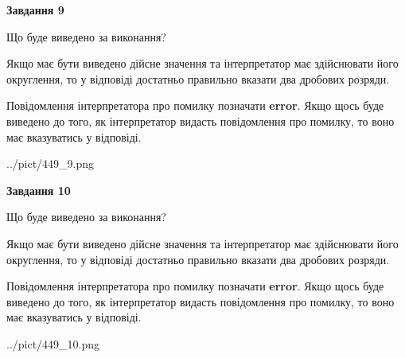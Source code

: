 \documentclass[12pt, ukrainian]{article}
\begin{document}
{\begin {Large}
{\begin {center}\textbf{Завдання 9}\end {center}}\par
Що буде виведено за виконання? \par

Якщо має бути виведено дійсне значення та інтерпретатор має здійснювати його округлення, 
то у відповіді достатньо правильно вказати два дробових розряди.

Повідомлення інтерпретатора про помилку позначати \textbf{error}.
Якщо щось буде виведено до того, як інтерпретатор видасть повідомлення про помилку, 
то воно має вказуватись у відповіді. \par

\begin{center}
	{../pict/449_9.png}
\end{center}
\newpage

{\begin {center}\textbf{Завдання 10}\end {center}}\par
Що буде виведено за виконання? \par

Якщо має бути виведено дійсне значення та інтерпретатор має здійснювати його округлення, 
то у відповіді достатньо правильно вказати два дробових розряди.

Повідомлення інтерпретатора про помилку позначати \textbf{error}.
Якщо щось буде виведено до того, як інтерпретатор видасть повідомлення про помилку, 
то воно має вказуватись у відповіді. \par

\begin{center}
	{../pict/449_10.png}
\end{center}
\newpage

\end {Large}}
\end{document}
